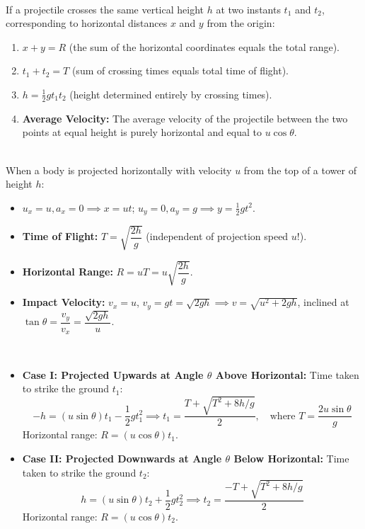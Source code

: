 \documentclass[11pt,a4paper]{article}
\begin{document}
\vspace{5pt}
\noindent{\large\textbf{\textsf{\textcolor{primaryDark}{1.4 Two-Point Crossing Theorems (From Notes)}}}}\\[3pt]
If a projectile crosses the same vertical height $h$ at two instants $t_1$ and $t_2$, corresponding to horizontal distances $x$ and $y$ from the origin:
\begin{enumerate}[label=(\alph*),leftmargin=14pt,itemsep=2pt]
  \item $x + y = R$ (the sum of the horizontal coordinates equals the total range).
  \item $t_1 + t_2 = T$ (sum of crossing times equals total time of flight).
  \item $h = \frac{1}{2}gt_1 t_2$ (height determined entirely by crossing times).
  \item \textbf{Average Velocity:} The average velocity of the projectile between the two points at equal height is purely horizontal and equal to $u\cos\theta$.
\end{enumerate}

\vspace{5pt}
\noindent{\large\textbf{\textsf{\textcolor{primaryDark}{1.5 Horizontal Projection from a Height $h$}}}}\\[3pt]
When a body is projected horizontally with velocity $u$ from the top of a tower of height $h$:
\begin{itemize}[leftmargin=14pt,itemsep=1.5pt]
  \item $u_x = u, a_x = 0 \implies x = ut$; \quad $u_y = 0, a_y = g \implies y = \frac{1}{2}gt^2$.
  \item \textbf{Time of Flight:} $T = \sqrt{\dfrac{2h}{g}}$ (independent of projection speed $u$!).
  \item \textbf{Horizontal Range:} $R = uT = u\sqrt{\dfrac{2h}{g}}$.
  \item \textbf{Impact Velocity:} $v_x = u$, $v_y = gt = \sqrt{2gh} \implies v = \sqrt{u^2 + 2gh}$, inclined at $\tan\theta = \dfrac{v_y}{v_x} = \dfrac{\sqrt{2gh}}{u}$.
\end{itemize}

\vspace{5pt}
\noindent{\large\textbf{\textsf{\textcolor{primaryDark}{1.6 Angled Projection from a Height $h$ (From Notes)}}}}\\[3pt]
\begin{itemize}[leftmargin=14pt,itemsep=2pt]
  \item \textbf{Case I: Projected Upwards at Angle $\theta$ Above Horizontal:}
  Time taken to strike the ground $t_1$:
  \[
    -h = (u\sin\theta)t_1 - \frac{1}{2}gt_1^2 \implies t_1 = \frac{T + \sqrt{T^2 + 8h/g}}{2}, \quad \text{where } T = \frac{2u\sin\theta}{g}
  \]
  Horizontal range: $R = (u\cos\theta)t_1$.
  \item \textbf{Case II: Projected Downwards at Angle $\theta$ Below Horizontal:}
  Time taken to strike the ground $t_2$:
  \[
    h = (u\sin\theta)t_2 + \frac{1}{2}gt_2^2 \implies t_2 = \frac{-T + \sqrt{T^2 + 8h/g}}{2}
  \]
  Horizontal range: $R = (u\cos\theta)t_2$.
\end{itemize}
\end{document}
